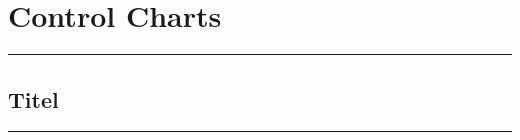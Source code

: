 \section{Control Charts}
\noindent\rule[\linienAbstand]{\linewidth}{\linienDickeDick}

\subsection{Titel}
\noindent\rule[\linienAbstand]{\linewidth}{\linienDicke}
